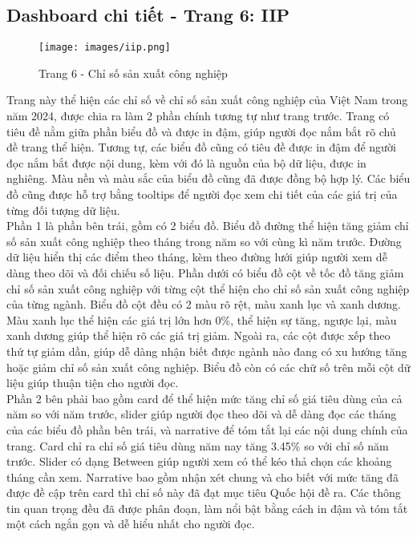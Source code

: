 \documentclass[a4paper]{report}
\begin{document}
{{\subsection{Dashboard chi tiết - Trang 6: IIP}

\begin{figure}[H]
    \centering
    \texttt{[image: images/iip.png]}
    \caption{Trang 6 - Chỉ số sản xuất công nghiệp}
    \label{fig:enter-label}
\end{figure}

Trang này thể hiện các chỉ số về chỉ số sản xuất công nghiệp của Việt Nam trong năm 2024, được chia ra làm 2 phần chính tương tự như trang trước. Trang có tiêu đề nằm giữa phần biểu đồ và được in đậm, giúp người đọc nắm bắt rõ chủ đề trang thể hiện. Tương tự, các biểu đồ cũng có tiêu đề được in đậm để người đọc nắm bắt được nội dung, kèm với đó là nguồn của bộ dữ liệu, được in nghiêng. Màu nền và màu sắc của biểu đồ cũng đã được đồng bộ hợp lý. Các biểu đồ cũng được hỗ trợ bằng tooltips để người đọc xem chi tiết của các giá trị của từng đối tượng dữ liệu. \\
Phần 1 là phần bên trái, gồm có 2 biểu đồ. Biểu đồ đường thể hiện tăng giảm chỉ số sản xuất công nghiệp theo tháng trong năm so với cùng kì năm trước. Đường dữ liệu hiển thị các điểm theo tháng, kèm theo đường lưới giúp người xem dễ dàng theo dõi và đối chiếu số liệu. Phần dưới có biểu đồ cột về tốc đồ tăng giảm chỉ số sản xuất công nghiệp với từng cột thể hiện cho chỉ số sản xuất công nghiệp của từng ngành. Biểu đồ cột đều có 2 màu rõ rệt, màu xanh lục và xanh dương. Màu xanh lục thể hiện các giá trị lớn hơn 0\%, thể hiện sự tăng, ngược lại, màu xanh dương giúp thể hiện rõ các giá trị giảm. Ngoài ra, các cột được xếp theo thứ tự giảm dần, giúp dễ dàng nhận biết được ngành nào đang có xu hướng tăng hoặc giảm chỉ số sản xuất công nghiệp. Biểu đồ còn có các chữ số trên mỗi cột dữ liệu giúp thuận tiện cho người đọc. \\
Phần 2 bên phải bao gồm card để thể hiện mức tăng chỉ số giá tiêu dùng của cả năm so với năm trước, slider giúp người đọc theo dõi và dễ dàng đọc các tháng của các biểu đồ phần bên trái, và narrative để tóm tắt lại các nội dung chính của trang. Card chỉ ra chỉ số giá tiêu dùng năm nay tăng 3.45\% so với chỉ số năm trước. Slider có dạng Between giúp người xem có thể kéo thả chọn các khoảng tháng cần xem. Narrative bao gồm nhận xét chung và cho biết với mức tăng đã được đề cập trên card thì chỉ số này đã đạt mục tiêu Quốc hội đề ra. Các thông tin quan trọng đều đã được phân đoạn, làm nổi bật bằng cách in đậm và tóm tắt một cách ngắn gọn và dễ hiểu nhất cho người đọc.
\newpage
}}
\end{document}
